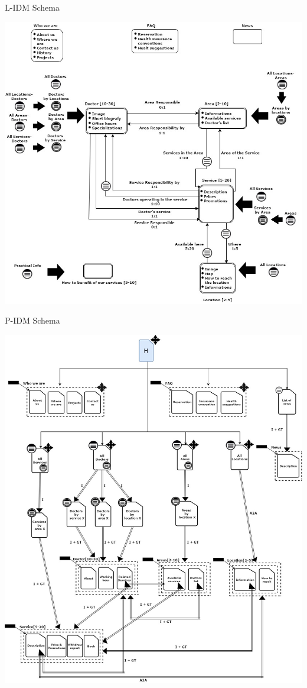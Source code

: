 \documentclass{../Common/Structure/doc_pdf}
\begin{document}
{\centering 
L-IDM Schema
\vspace{1cm}
\begin{center}
	\includegraphics[width=\textwidth]{Clinic_L_IDM.jpg}
\end{center}}

\newpage

{\centering 
P-IDM Schema
\vspace{1cm}
\begin{center}
	\includegraphics[width=\textwidth]{Clinic_P_IDM.jpg}
\end{center}}
\end{document}
